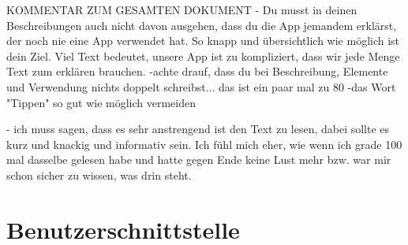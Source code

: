 KOMMENTAR ZUM GESAMTEN DOKUMENT
- Du musst in deinen Beschreibungen auch nicht davon ausgehen, dass du die App jemandem erklärst, der noch nie eine App verwendet hat. So knapp  und übersichtlich wie möglich ist dein Ziel. Viel Text bedeutet, unsere App ist zu kompliziert, dass wir jede Menge Text zum erklären brauchen. 
-achte drauf, dass du bei Beschreibung, Elemente und Verwendung nichts doppelt schreibst... das ist ein paar mal zu 80%
-das Wort "Tippen" so gut wie möglich vermeiden

- ich muss sagen, dass es sehr anstrengend ist den Text zu lesen, dabei sollte es kurz und knackig und informativ sein. Ich fühl mich eher, wie wenn ich grade 100 mal dasselbe gelesen habe und hatte gegen Ende keine Lust mehr bzw. war mir schon sicher zu wissen, was drin steht.  


\section{Benutzerschnittstelle}
